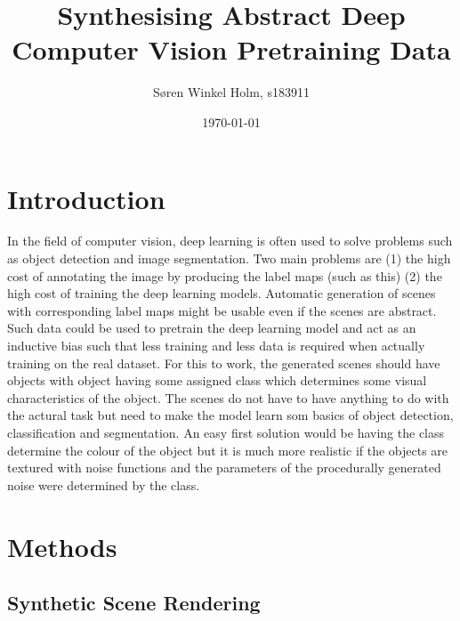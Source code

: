 \documentclass[12pt,fleqn]{article}
\title{Synthesising Abstract Deep Computer Vision Pretraining Data}
\author{Søren Winkel Holm, s183911}
\date{\today}
\begin{document}
\maketitle
\thispagestyle{fancy}
\tableofcontents
\newpage


\section{Introduction}%
\label{sec:intro}
In the field of computer vision, deep learning is often used to solve problems such as object detection and image segmentation. Two main problems are (1) the high cost of annotating the image by producing the label maps (such as this) (2) the high cost of training the deep learning models. Automatic generation of scenes with corresponding label maps might be usable even if the scenes are abstract. Such data could be used to pretrain the deep learning model and act as an inductive bias such that less training and less data is required when actually training on the real dataset. For this to work, the generated scenes should have objects with object having some assigned class which determines some visual characteristics of the object. The scenes do not have to have anything to do with the actural task but need to make the model learn som basics of object detection, classification and segmentation. An easy first solution would be having the class determine the colour of the object but it is much more realistic if the objects are textured with noise functions and the parameters of the procedurally generated noise were determined by the class.

\section{Methods}%
\label{sec:method}
\subsection{Synthetic Scene Rendering}
\end{document}
